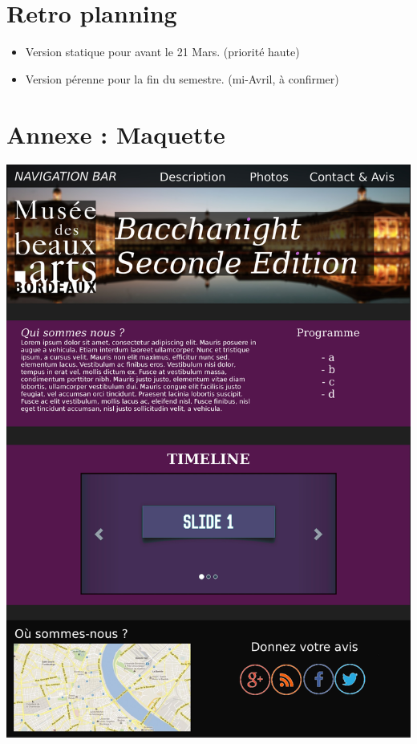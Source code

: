 \documentclass[11pt]{report}
\begin{document}
\section{Retro planning}

\begin{itemize}
	\item Version statique pour avant le 21 Mars. (priorité haute)
	\item Version pérenne pour la fin du semestre. (mi-Avril, à confirmer)
\end{itemize}


\newpage

\section{Annexe : Maquette}

\vspace{0.4cm}
\includegraphics[scale=0.75]{maquette.jpg}
\end{document}
